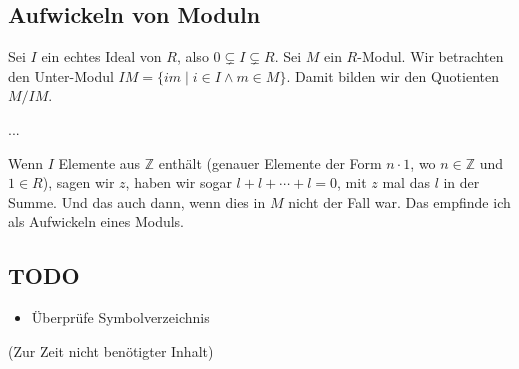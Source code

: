 \documentclass[a4paper]{amsart}
\theoremstyle{definition}
\newcommand{\Z}{\ensuremath{\mathbb{ Z }}}
\begin{document}
\subsection{Aufwickeln von Moduln}
Sei $I$ ein echtes Ideal von $R$, also $0 \subsetneq I \subsetneq R$. Sei $M$ ein $R$-Modul. Wir betrachten den Unter-Modul $IM = \{im \mid i \in I \land m \in M\}$. Damit bilden wir den Quotienten $M/IM$.

...

Wenn $I$ Elemente aus $\Z$ enthält (genauer Elemente der Form $n\cdot 1$, wo $n \in \Z$ und $1 \in R$), sagen wir $z$, haben wir sogar $l + l + \cdots + l = 0$, mit $z$ mal das $l$ in der Summe. Und das auch dann, wenn dies in $M$ nicht der Fall war. Das empfinde ich als Aufwickeln eines Moduls.  




\begin{backup}
\section{TODO}
\begin{itemize}
     \item Überprüfe Symbolverzeichnis
\end{itemize}


\end{backup}

\begin{backup}
    (Zur Zeit nicht benötigter Inhalt)
\end{backup}
\end{document}
